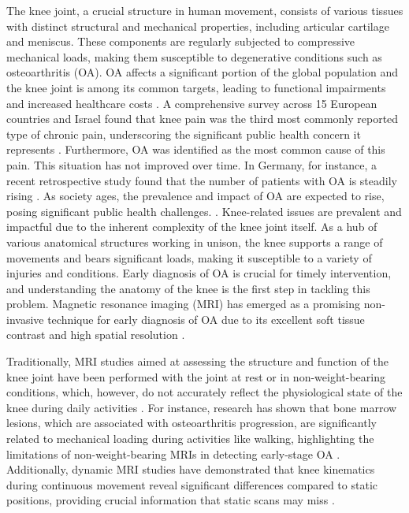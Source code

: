 \documentclass{micro-econ-thesis}
\begin{document}
The knee joint, a crucial structure in human movement, consists of various tissues with distinct structural and mechanical properties, including articular cartilage and meniscus. These components are regularly subjected to compressive mechanical loads, making them susceptible to degenerative conditions such as osteoarthritis (OA). OA affects a significant portion of the global population and the knee joint is among its common targets, leading to functional impairments and increased healthcare costs \parencite{WHO}. A comprehensive survey across 15 European countries and Israel found that knee pain was the third most commonly reported type of chronic pain, underscoring the significant public health concern it represents \parencite{breivik_survey_2006}. Furthermore, OA was identified as the most common cause of this pain. This situation has not improved over time. In Germany, for instance, a recent retrospective study found that the number of patients with OA is steadily rising \parencite{obermuller_epidemiology_2024}. As society ages, the prevalence and impact of OA are expected to rise, posing significant public health challenges. \parencite{yelin_burden_2016}. Knee-related issues are prevalent and impactful due to the inherent complexity of the knee joint itself. As a hub of various anatomical structures working in unison, the knee supports a range of movements and bears significant loads, making it susceptible to a variety of injuries and conditions. Early diagnosis of OA is crucial for timely intervention, and understanding the anatomy of the knee is the first step in tackling this problem. Magnetic resonance imaging (MRI) has emerged as a promising non-invasive technique for early diagnosis of OA due to its excellent soft tissue contrast and high spatial resolution \parencite{kijowski_osteoarthritis_2020}. 

Traditionally, MRI studies aimed at assessing the structure and function of the knee joint have been performed with the joint at rest or in non-weight-bearing conditions, which, however, do not accurately reflect the physiological state of the knee during daily activities \parencite{blankevoort_envelope_1988}. For instance, research has shown that bone marrow lesions, which are associated with osteoarthritis progression, are significantly related to mechanical loading during activities like walking, highlighting the limitations of non-weight-bearing MRIs in detecting early-stage OA \parencite{bennell_bone_2010}. Additionally, dynamic MRI studies have demonstrated that knee kinematics during continuous movement reveal significant differences compared to static positions, providing crucial information that static scans may miss \parencite{dentremont_dynamicbased_2013}.
\end{document}
